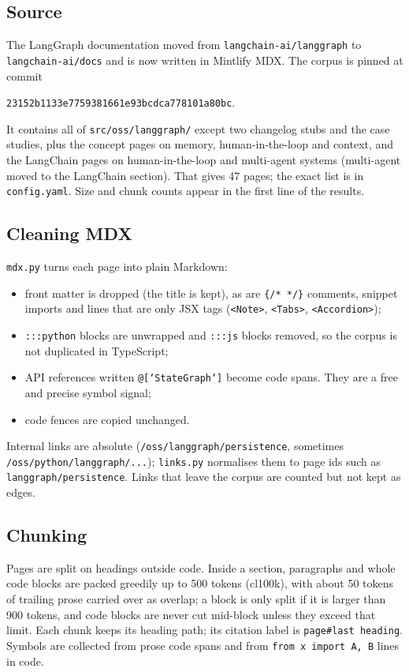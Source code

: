\documentclass[11pt,a4paper]{article}
\newcommand{\code}[1]{\texttt{#1}}
\begin{document}
\subsection{Source}

The LangGraph documentation moved from \code{langchain-ai/langgraph} to
\code{langchain-ai/docs} and is now written in Mintlify MDX. The corpus is pinned at commit
\begin{center}\code{23152b1133e7759381661e93bcdca778101a80bc}.\end{center}
It contains all of \code{src/oss/langgraph/}
except two changelog stubs and the case studies, plus the concept pages on memory,
human-in-the-loop and context, and the LangChain pages on human-in-the-loop and multi-agent
systems (multi-agent moved to the LangChain section). That gives 47 pages; the exact list is in
\code{config.yaml}. Size and chunk counts appear in the first line of the results.

\subsection{Cleaning MDX}

\code{mdx.py} turns each page into plain Markdown:
\begin{itemize}
  \item front matter is dropped (the title is kept), as are \code{\{/* */\}} comments, snippet
  imports and lines that are only JSX tags (\code{<Note>}, \code{<Tabs>}, \code{<Accordion>});
  \item \code{:::python} blocks are unwrapped and \code{:::js} blocks removed, so the corpus is
  not duplicated in TypeScript;
  \item API references written \code{@[`StateGraph`]} become code spans. They are a free and
  precise symbol signal;
  \item code fences are copied unchanged.
\end{itemize}
Internal links are absolute (\code{/oss/langgraph/persistence}, sometimes
\code{/oss/python/langgraph/...}); \code{links.py} normalises them to page ids such as
\code{langgraph/persistence}. Links that leave the corpus are counted but not kept as edges.

\subsection{Chunking}

Pages are split on headings outside code. Inside a section, paragraphs and whole code blocks are
packed greedily up to 500 tokens (cl100k), with about 50 tokens of trailing prose carried over as
overlap; a block is only split if it is larger than 900 tokens, and code blocks are never cut
mid-block unless they exceed that limit. Each chunk keeps its heading path; its citation label
is \code{page\#last heading}. Symbols are collected from prose code spans and from
\code{from x import A, B} lines in code.
\end{document}
